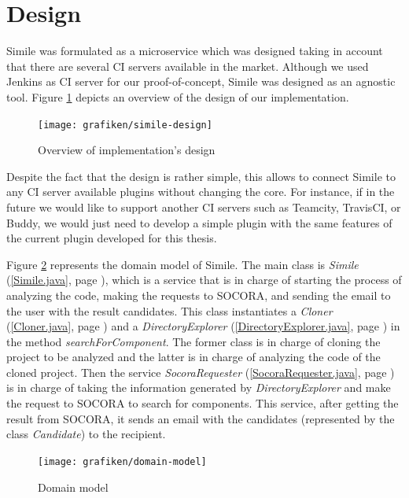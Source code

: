 \section{Design}
Simile was formulated as a microservice which was designed taking in account that there are several CI servers available in the market. Although we used Jenkins as CI server for our proof-of-concept, Simile was designed as an agnostic tool. Figure \ref{fig:simile-design} depicts an overview of the design of our implementation.

\begin{figure}[H]
	\centering
    \texttt{[image: grafiken/simile-design]}
    \caption{Overview of implementation's design}
    \label{fig:simile-design}
\end{figure}

Despite the fact that the design is rather simple, this allows to connect Simile to any CI server available plugins without changing the core. For instance, if in the future we would like to support another CI servers such as Teamcity, TravisCI, or Buddy, we would just need to develop a simple plugin with the same features of the current plugin developed for this thesis.

Figure \ref{fig:domain-model} represents the domain model of Simile. The main class is \emph{Simile} (\ref{Simile.java}, page \pageref{Simile.java}), which is a service that is in charge of starting the process of analyzing the code, making the requests to SOCORA, and sending the email to the user with the result candidates. This class instantiates a \emph{Cloner} (\ref{Cloner.java}, page \pageref{Cloner.java}) and a \emph{DirectoryExplorer} (\ref{DirectoryExplorer.java}, page \pageref{DirectoryExplorer.java}) in the method \emph{searchForComponent}. The former class is in charge of cloning the project to be analyzed and the latter is in charge of analyzing the code of the cloned project. Then the service \emph{SocoraRequester} (\ref{SocoraRequester.java}, page \pageref{SocoraRequester.java}) is in charge of taking the information generated by \emph{DirectoryExplorer} and make the request to SOCORA to search for components. This service, after getting the result from SOCORA, it sends an email with the candidates (represented by the class \emph{Candidate}) to the recipient. 

\begin{figure}[H]
	\centering
    \texttt{[image: grafiken/domain-model]}
    \caption{Domain model}
    \label{fig:domain-model}
\end{figure}

